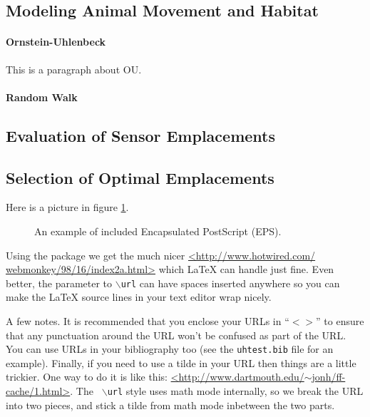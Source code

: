\subsection{Modeling Animal Movement and Habitat}
\paragraph{Ornstein-Uhlenbeck}
This is a paragraph about OU.
\paragraph{Random Walk}
\subsection{Evaluation of Sensor Emplacements}
\subsection{Selection of Optimal Emplacements}


Here is a picture in figure \ref{fig:example-1}.

\begin{figure}[htbp]
  \centering
  \caption{An example of included Encapsulated PostScript (EPS).}
  \label{fig:example-1}
\end{figure}

Using the package we get the much nicer \url{<http://www.hotwired.com/
webmonkey/98/16/index2a.html>} which LaTeX can handle just fine. Even better,
the parameter to {\tt $\backslash$url} can have spaces inserted anywhere so you
can make the LaTeX source lines in your text editor wrap nicely.

A few notes. It is recommended that you enclose your URLs in ``$<>$'' to ensure
that any punctuation around the URL won't be confused as part of the URL. You
can use URLs in your bibliography too (see the {\tt uhtest.bib} file for an
example). Finally, if you need to use a tilde in your URL then things are a
little trickier. One way to do it is like this:
\url{<http://www.dartmouth.edu/}$\sim$\url{jonh/ff-cache/1.html>}. The {\tt
$\backslash$url} style uses math mode internally, so we break the URL into two
pieces, and stick a tilde from math mode inbetween the two parts.

